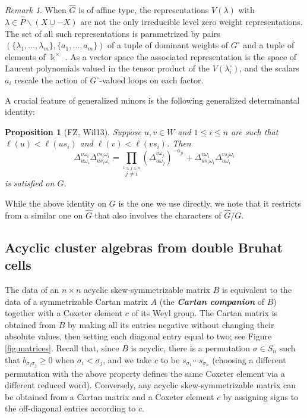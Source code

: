 \documentclass[12pt]{amsart}
\newcommand{\sayDR}[1]{\say[DR]{\color{red}{\bf DR:}\;#1}}
\newcommand{\newword}[1]{\textbf{\emph{#1}}}
\newcommand{\kk}{\Bbbk}%
\newtheorem{proposition}[theorem]{Proposition}
\theoremstyle{remark}
\newtheorem{remark}[theorem]{Remark}
\numberwithin{equation}{section}
\numberwithin{figure}{section}
\begin{document}
\begin{remark}
When $\widehat{G}$ is of affine type, the representations $V(\lambda)$ with $\lambda \in \widehat{P}\smallsetminus(X \cup - X)$ are not the only irreducible level zero weight representations. The set of all such representations is parametrized by pairs $(\{\lambda_1,\dotsc,\lambda_m\},\{a_1,\dotsc,a_m\})$ of a tuple of dominant weights of $G^\circ$ and a tuple of elements of $\kk^\times$ \cite{CP86}. As a vector space the associated representation is the space of Laurent polynomials valued in the tensor product of the $V(\lambda_i^\circ)$, and the scalars $a_i$ rescale the action of $G^\circ$-valued loops on each factor.
\end{remark}

A crucial feature of generalized minors is the following generalized determinantal identity:

\begin{proposition}[FZ, Wil13]
  \label{prop:fundid}
  Suppose $u,v \in W$ and $1 \leq i \leq n$ are such that $\ell(u)<\ell(us_i)$ and $\ell(v)<\ell(vs_i)$. 
  Then 
  \begin{equation}
    \label{eq:fundid}
    \Delta_{u\omega_i}^{v\omega_i} \Delta_{us_i\omega_i}^{vs_i\omega_i} 
    =
    \prod_{\stackrel{1\leq j \leq n}{j\neq i}}\left(\Delta_{u\omega_j}^{v\omega_j}\right)^{-a_{ji}}
    +
    \Delta_{us_i\omega_i}^{v\omega_i} \Delta_{u\omega_i}^{vs_i\omega_i}
  \end{equation}
is satisfied on $G$.
\end{proposition}

While the above identity on $G$ is the one we use directly, we note that it restricts from a similar one on $\widehat{G}$ that also involves the characters of $\widehat{G}/G$.

\subsection{Acyclic cluster algebras from double Bruhat cells}

The data of an $n\times n$ acyclic skew-symmetrizable matrix $B$ is equivalent to the data of a symmetrizable Cartan matrix $A$ (the \newword{Cartan companion} of $B$) together with a Coxeter element $c$ of its Weyl group.
The Cartan matrix is obtained from $B$ by making all its entries negative without changing their absolute values, then setting each diagonal entry equal to two; see Figure \ref{fig:matrices}.
Recall that, since $B$ is acyclic, there is a permutation $\sigma \in S_n$ such that $b_{\sigma_i \sigma_j} \geq 0$ when $\sigma_i < \sigma_j$, and we take $c$ to be $s_{\sigma_1} \cdots s_{\sigma_n}$\sayDR{Fix this definition} (choosing a different permutation with the above property defines the same Coxeter element via a different reduced word).
Conversely, any acyclic skew-symmetrizable matrix can be obtained from a Cartan matrix and a Coxeter element $c$ by assigning signs to the off-diagonal entries according to $c$.
\end{document}
